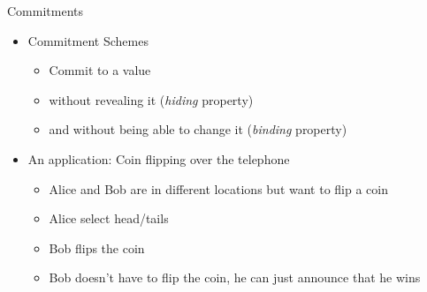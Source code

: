 \documentclass{beamer}
\begin{document}
\begin{frame}{Commitments}
\begin{itemize}
\item Commitment Schemes
\begin{itemize}
\item Commit to a value 
\item without revealing it (\textit{hiding} property)
\item and without being able to change it (\textit{binding} property)
\end{itemize}
\item An application: Coin flipping over the telephone
\begin{itemize}
\item Alice and Bob are in different locations but want to flip a coin
\item Alice select head/tails
\item Bob flips the coin 
\item Bob doesn't have to flip the coin, he can just announce that he wins
\end{itemize}
\end{itemize} 
\end{frame}
\end{document}
